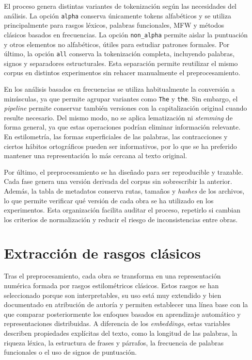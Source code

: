 \documentclass[IB]{TFUOC}%
\begin{document}
El proceso genera distintas variantes de tokenización según las necesidades del análisis. La opción \texttt{alpha} conserva únicamente tokens alfabéticos y se utiliza principalmente para rasgos léxicos, palabras funcionales, MFW y métodos clásicos basados en frecuencias. La opción \texttt{non\_alpha} permite aislar la puntuación y otros elementos no alfabéticos, útiles para estudiar patrones formales. Por último, la opción \texttt{all} conserva la tokenización completa, incluyendo palabras, signos y separadores estructurales. Esta separación permite reutilizar el mismo corpus en distintos experimentos sin rehacer manualmente el preprocesamiento.

En los análisis basados en frecuencias se utiliza habitualmente la conversión a minúsculas, ya que permite agrupar variantes como \texttt{The} y \texttt{the}. Sin embargo, el \textit{pipeline} permite conservar también versiones con la capitalización original cuando resulte necesario. Del mismo modo, no se aplica lematización ni \textit{stemming} de forma general, ya que estas operaciones podrían eliminar información relevante. En estilometría, las formas superficiales de las palabras, las contracciones y ciertos hábitos ortográficos pueden ser informativos, por lo que se ha preferido mantener una representación lo más cercana al texto original.

Por último, el preprocesamiento se ha diseñado para ser reproducible y trazable. Cada fase genera una versión derivada del corpus sin sobrescribir la anterior. Además, la tabla de metadatos conserva rutas, tamaños y \textit{hashes} de los archivos, lo que permite verificar qué versión de cada obra se ha utilizado en los experimentos. Esta organización facilita auditar el proceso, repetirlo si cambian los criterios de normalización y reducir el riesgo de inconsistencias entre obras.

\section{Extracción de rasgos clásicos}

Tras el preprocesamiento, cada obra se transforma en una representación numérica formada por rasgos estilométricos clásicos. Estos rasgos se han seleccionado porque son interpretables, su uso está muy extendido y bien documentado en atribución de autoría y permiten establecer una línea base con la que comparar posteriormente los enfoques basados en aprendizaje automático y representaciones distribuidas. A diferencia de los \textit{embeddings}, estas variables describen propiedades explícitas del texto, como la longitud de las palabras, la riqueza léxica, la estructura de frases y párrafos, la frecuencia de palabras funcionales o el uso de signos de puntuación.
\end{document}
